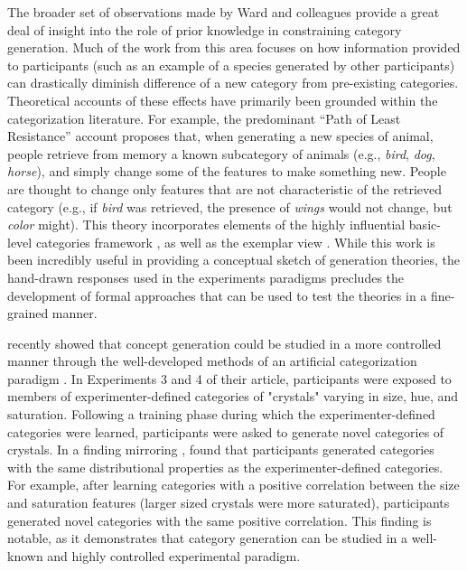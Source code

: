 \documentclass[12pt]{article}
\begin{document}
\begin{flushleft}
The broader set of observations made by Ward and colleagues provide a great deal
of insight into the role of prior knowledge in constraining category generation.
Much of the work from this area
\citep[e.g.,][]{smith1993constraining,marsh1999inadvertent} focuses on how
information provided to participants (such as an example of a species generated
by other participants) can drastically diminish difference of a new category
from pre-existing categories. Theoretical accounts of these effects have
primarily been grounded within the categorization literature. For example, the
predominant ``Path of Least Resistance'' account
\citep[see][]{ward1994structured,ward1995s,ward2002role} proposes that, when
generating a new species of animal, people retrieve from memory a known
subcategory of animals (e.g., {\em bird}, {\em dog}, {\em horse}), and simply
change some of the features to make something new. People are thought to change
only features that are not characteristic of the retrieved category (e.g., if
{\em bird} was retrieved, the presence of {\em wings} would not change, but {\em
color} might). This theory incorporates elements of the highly influential
basic-level categories framework \citep{rosch1975cognitive,rosch1976basic}, as
well as the exemplar view \citep{medin1978context,brooks1978nonanalytic}. While
this work is been incredibly useful in providing a conceptual sketch of
generation theories, the hand-drawn responses used in the experiments paradigms
precludes the development of formal approaches that can be used to test the
theories in a fine-grained manner.

\cite{jern2013probabilistic} recently showed that concept generation could be
studied in a more controlled manner through the well-developed methods of an
artificial categorization paradigm \citep[see][for a review]{kurtz2015human}. In
Experiments 3 and 4 of their article, participants were exposed to members of
experimenter-defined categories of "crystals" varying in size, hue, and
saturation. Following a training phase during which the experimenter-defined
categories were learned, participants were asked to generate novel categories of
crystals. In a finding mirroring \cite{ward1994structured},
\cite{jern2013probabilistic} found that participants generated categories with
the same distributional properties as the experimenter-defined categories. For
example, after learning categories with a positive correlation between the
size and saturation features (larger sized crystals were more saturated),
participants generated novel categories with the same positive correlation. This
finding is notable, as it demonstrates that category generation can be studied
in a well-known and highly controlled experimental paradigm.


\end{flushleft}
\end{document}
